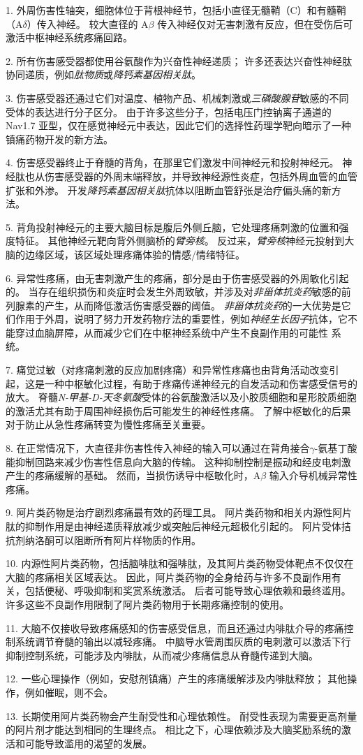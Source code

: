 1. 外周伤害性轴突，细胞体位于背根神经节，包括小直径无髓鞘（C）和有髓鞘（A$\delta$）传入神经。
较大直径的 A$\beta$ 传入神经仅对无害刺激有反应，但在受伤后可激活中枢神经系统疼痛回路。 


2. 所有伤害感受器都使用谷氨酸作为兴奋性神经递质； 许多还表达兴奋性神经肽协同递质，例如\textit{肽物质}或\textit{降钙素基因相关肽}。


3. 伤害感受器还通过它们对温度、植物产品、机械刺激或\textit{三磷酸腺苷}敏感的不同受体的表达进行分子区分。
由于许多这些分子，包括电压门控钠离子通道的 Nav1.7 亚型，仅在感觉神经元中表达，因此它们的选择性药理学靶向暗示了一种镇痛药物开发的新方法。


4. 伤害感受器终止于脊髓的背角，在那里它们激发中间神经元和投射神经元。
神经肽也从伤害感受器的外周末端释放，并导致神经源性炎症，包括外周血管的血管扩张和外渗。
开发\textit{降钙素基因相关肽}抗体以阻断血管舒张是治疗偏头痛的新方法。 


5. 背角投射神经元的主要大脑目标是腹后外侧丘脑，它处理疼痛刺激的位置和强度特征。
其他神经元靶向背外侧脑桥的\textit{臂旁核}。
反过来，\textit{臂旁核}神经元投射到大脑的边缘区域，该区域处理疼痛体验的情感/情绪特征。
 

6. 异常性疼痛，由无害刺激产生的疼痛，部分是由于伤害感受器的外周敏化引起的。
当存在组织损伤和炎症时会发生外周致敏，并涉及对\textit{非甾体抗炎药}敏感的前列腺素的产生，从而降低激活伤害感受器的阈值。
\textit{非甾体抗炎药}的一大优势是它们作用于外周，说明了努力开发药物疗法的重要性，例如\textit{神经生长因子}抗体，它不能穿过血脑屏障，从而减少它们在中枢神经系统中产生不良副作用的可能性 系统。 


7. 痛觉过敏（对疼痛刺激的反应加剧疼痛）和异常性疼痛也由背角活动改变引起，这是一种中枢敏化过程，有助于疼痛传递神经元的自发活动和伤害感受信号的放大。
脊髓\textit{N-甲基-D-天冬氨酸}受体的谷氨酸激活以及小胶质细胞和星形胶质细胞的激活尤其有助于周围神经损伤后可能发生的神经性疼痛。
了解中枢敏化的后果对于防止从急性疼痛转变为慢性疼痛至关重要。 


8. 在正常情况下，大直径非伤害性传入神经的输入可以通过在背角接合$\gamma$-氨基丁酸能抑制回路来减少伤害性信息向大脑的传输。
这种抑制控制是振动和经皮电刺激产生的疼痛缓解的基础。
然而，当损伤诱导中枢敏化时，A$\beta$ 输入介导机械异常性疼痛。
 

9. 阿片类药物是治疗剧烈疼痛最有效的药理工具。
阿片类药物和相关内源性阿片肽的抑制作用是由神经递质释放减少或突触后神经元超极化引起的。
阿片受体拮抗剂纳洛酮可以阻断所有阿片样物质的作用。 


10. 内源性阿片类药物，包括脑啡肽和强啡肽，及其阿片类药物受体靶点不仅仅在大脑的疼痛相关区域表达。
因此，阿片类药物的全身给药与许多不良副作用有关，包括便秘、呼吸抑制和奖赏系统激活。
后者可能导致心理依赖和最终滥用。
许多这些不良副作用限制了阿片类药物用于长期疼痛控制的使用。


11. 大脑不仅接收导致疼痛感知的伤害感受信息，而且还通过内啡肽介导的疼痛控制系统调节脊髓的输出以减轻疼痛。
中脑导水管周围灰质的电刺激可以激活下行抑制控制系统，可能涉及内啡肽，从而减少疼痛信息从脊髓传递到大脑。


12. 一些心理操作（例如，安慰剂镇痛）产生的疼痛缓解涉及内啡肽释放；
其他操作，例如催眠，则不会。


13. 长期使用阿片类药物会产生耐受性和心理依赖性。
耐受性表现为需要更高剂量的阿片剂才能达到相同的生理终点。
相比之下，心理依赖涉及大脑奖励系统的激活和可能导致滥用的渴望的发展。


